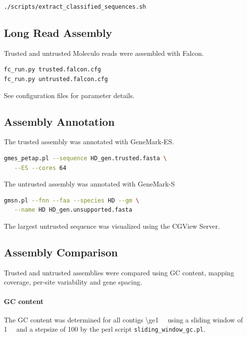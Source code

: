 \documentclass[12pt,a4paper]{scrartcl}
\begin{document}
\begin{lstlisting}[language=bash]
./scripts/extract_classified_sequences.sh
\end{lstlisting}

\subsection*{Long Read Assembly}

Trusted and untrusted Moleculo reads were assembled with Falcon.

\begin{lstlisting}[language=bash]
fc_run.py trusted.falcon.cfg
fc_run.py untrusted.falcon.cfg
\end{lstlisting}

See configuration files for parameter details.

\subsection*{Assembly Annotation}
The trusted assembly was annotated with GeneMark-ES.

\begin{lstlisting}[language=bash]
gmes_petap.pl --sequence HD_gen.trusted.fasta \
   --ES --cores 64
\end{lstlisting}

The untrusted assembly was annotated with GeneMark-S

\begin{lstlisting}[language=bash]
gmsn.pl --fnn --faa --species HD --gm \
   --name HD HD_gen.unsupported.fasta
\end{lstlisting}

The largest untrusted sequence was visualized using the CGView Server.

\subsection*{Assembly Comparison}

Trusted and untrusted assemblies were compared using GC content,
mapping coverage, per-site variability and gene spacing.

\paragraph{GC content}
The GC content was determined for all contigs
\SI{\ge1}{\kilo\basepair} using a sliding window of
\SI{1}{\kilo\basepair} and a stepsize of \SI{100}{\basepair} by the
perl script \texttt{sliding\_window\_gc.pl}.
\end{document}
